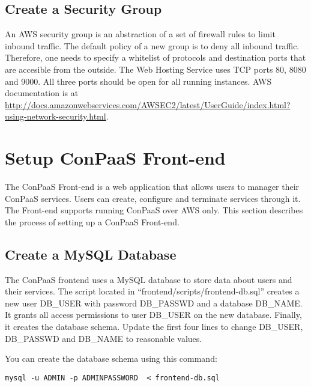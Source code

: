 \documentclass[12pt]{article}
\newenvironment{framedbox}[1]%
{\begin{framed}
 \begingroup
 \fontsize{#1}{#1}\selectfont
}
{
 \endgroup
 \end{framed}
}
\begin{document}
\subsection{Create a Security Group}

An AWS security group is an abstraction of a set of firewall rules to
limit inbound traffic. The default policy of a new group is to deny
all inbound traffic. Therefore, one needs to specify a whitelist of
protocols and destination ports that are accesible from the outside.
The Web Hosting Service uses TCP ports 80, 8080 and 9000. All three
ports should be open for all running instances.  AWS documentation is
at\\
\href{http://docs.amazonwebservices.com/AWSEC2/latest/UserGuide/index.html?using-network-security.html}{http://docs.amazonwebservices.com/AWSEC2/latest/UserGuide/index.html?using-network-security.html}.


\section{Setup ConPaaS Front-end}

The ConPaaS Front-end is a web application that allows users to
manager their ConPaaS services. Users can create, configure and
terminate services through it. The Front-end supports running ConPaaS
over AWS only. This section describes the process of setting up a
ConPaaS Front-end.

\subsection{Create a MySQL Database}

The ConPaaS frontend uses a MySQL database to store data about users
and their services. The script located in
``frontend/scripts/frontend-db.sql'' creates a new user DB\_USER with
password DB\_PASSWD and a database DB\_NAME. It grants all access
permissions to user DB\_USER on the new database. Finally, it creates
the database schema. Update the first four lines to change DB\_USER,
DB\_PASSWD and DB\_NAME to reasonable values.

You can create the database schema using this command:

\begin{framedbox}{8pt}\begin{verbatim}
mysql -u ADMIN -p ADMINPASSWORD  < frontend-db.sql
\end{verbatim}\end{framedbox}
\end{document}
